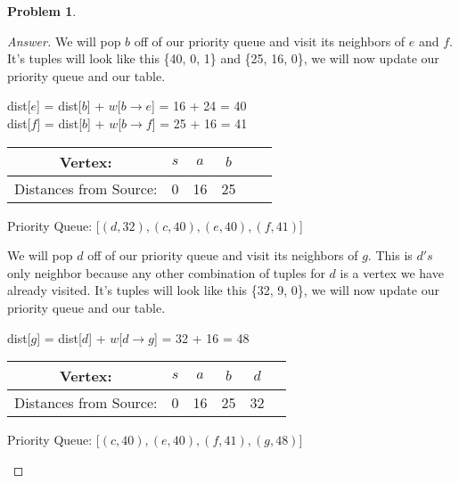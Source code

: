 \documentclass[11pt]{article}
\theoremstyle{definition}
\theoremstyle{definition}
\newtheorem{required}{Problem}
\theoremstyle{definition}
\begin{document}
\begin{required}
\begin{enumerate}[label=(\alph*)]
\begin{proof}[Answer]
We will pop $b$ off of our priority queue and visit its neighbors of $e$ and $f$. It's tuples will look like this \{40, 0, 1\} and \{25, 16, 0\}, we will now update our priority queue and our table.
\begin{center}
dist[$e$] = dist[$b$]  + $w$[$b \rightarrow e$] = 16 + 24 = 40 \\
dist[$f$] = dist[$b$] + $w$[$b \rightarrow f$] = 25 + 16 = 41\\
\begin{tabular}{ | c | c | c | c | c | c |}
 \hline
 Vertex:& $s$ & $a$ & $b$\\ 
 \hline
 Distances from Source:& 0 & 16 & 25\\  
 \hline
\end{tabular}
\end{center}
\begin{center}
Priority Queue: [$(d, 32), (c, 40), (e, 40), (f, 41)$]
\end{center}

We will pop $d$ off of our priority queue and visit its neighbors of $g$. This is $d's$ only neighbor because any other combination of tuples for $d$ is a vertex we have already visited. It's tuples will look like this \{32, 9, 0\}, we will now update our priority queue and our table.
\begin{center}
dist[$g$] = dist[$d$]  + $w$[$d \rightarrow g$] = 32 + 16 = 48 \\
\begin{tabular}{ | c | c | c | c | c | c |}
 \hline
 Vertex:& $s$ & $a$ & $b$ & $ d $\\ 
 \hline
 Distances from Source:& 0 & 16 & 25 & 32\\  
 \hline
\end{tabular}
\end{center}
\begin{center}
Priority Queue: [$(c, 40), (e, 40), (f, 41), (g, 48)$]
\end{center}


\end{proof}
\end{enumerate}
\end{required}
\end{document}
